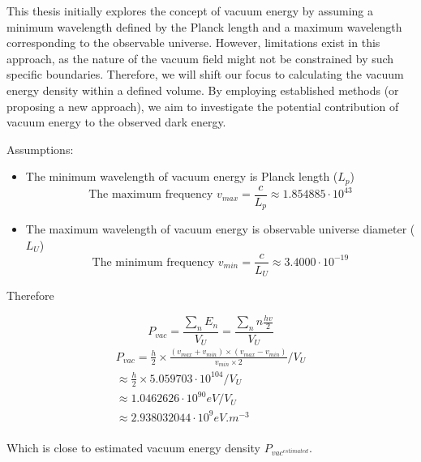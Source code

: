 This thesis initially explores the concept of vacuum energy by assuming 
a minimum wavelength defined by the Planck length and a maximum wavelength corresponding to the observable universe.  
However, limitations exist in this approach, as the nature of the vacuum field might not be constrained by such specific boundaries.
Therefore, we will shift our focus to calculating the vacuum energy density within a defined volume.
By employing established methods (or proposing a new approach), we aim to investigate the potential contribution of vacuum energy to the observed dark energy.
\par
Assumptions:
\begin{itemize}
    \item The minimum wavelength of vacuum energy is Planck length (\(L_{p}\))
    \[\text{The maximum frequency } v_{max} = \frac{c}{L_{p}} \approx 1.854885 \cdot 10^{43} \]
    \item The maximum wavelength of vacuum energy is observable universe diameter (\(L_{U}\))
    \[\text{The minimum frequency } v_{min} = \frac{c}{L_{U}} \approx 3.4000 \cdot 10^{-19}\]
\end{itemize}


Therefore

\[P_{vac} = \frac{\sum\limits_{n}E_{n}}{V_{U}} = \frac{\sum\limits_{n}n\frac{hv}{2}}{V_{U}}\]
\begin{equation}
\begin{aligned}
P_{vac} = \frac{h}{2} \times \frac{(v_{max} + v_{min})\times(v_{max}-v_{min})}{v_{min} \times 2} / V_{U}\\
\approx \frac{h}{2} \times 5.059703 \cdot 10^{104} / V_{U}\\
\approx 1.0462626 \cdot 10^{90} \si{eV} / V_{U}\\
\approx 2.938032044 \cdot 10^{9} \si{eV.m^{-3}}\\
\end{aligned}
\end{equation}

Which is close to estimated vacuum energy density \(P_{vac^{estimated}}\).
